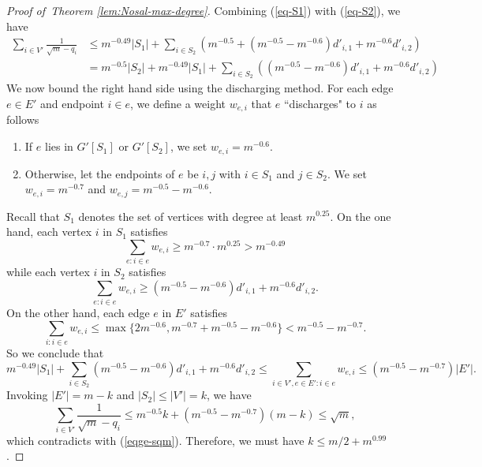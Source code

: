 \documentclass[10pt,a4paper]{amsart}
\newcommand*{\abs}[1]{\lvert#1\rvert}
\begin{document}
\begin{proof}[Proof of~Theorem \ref{lem:Nosal-max-degree}]
Combining (\ref{eq-S1}) with (\ref{eq-S2}), we have
\begin{align*}
 \sum_{i \in V'} \frac{1}{\sqrt{m} - q_i} &\leq m^{-0.49} \abs{S_1} + \sum_{i \in S_2} \left( 
m^{-0.5} + (m^{-0.5} - m^{-0.6}) d'_{i,1} + m^{-0.6} d'_{i,2} \right) \\
&= m^{-0.5} \abs{S_2} + m^{-0.49} \abs{S_1} + \sum_{i \in S_2} \left((m^{-0.5} - m^{-0.6}) d'_{i,1} + m^{-0.6} d'_{i,2} \right)
\end{align*}
We now bound the right hand side using the discharging method. For each edge $e \in E'$ and endpoint $i \in e$, we define a weight $w_{e, i}$ that $e$ ``discharges" to $i$ as follows
\begin{enumerate}
    \item If $e$ lies in $G'[S_1]$ or $G'[S_2]$, we set $w_{e, i} = m^{-0.6}$.
    \item Otherwise, let the endpoints of $e$ be $i, j$ with $i \in S_1$ and $j \in S_2$. We set $w_{e, i} = m^{-0.7}$ and $w_{e, j} = m^{-0.5} - m^{-0.6}$.
\end{enumerate}
Recall that $S_1$ denotes the set of vertices with degree at least $m^{0.25}$.  On the one hand, each vertex $i$ in $S_1$ satisfies
$$\sum_{e: i \in e} w_{e, i} \geq m^{-0.7} \cdot  m^{0.25} > m^{-0.49}$$
while each vertex $i$ in $S_2$ satisfies
$$\sum_{e: i \in e} w_{e, i} \geq (m^{-0.5} - m^{-0.6}) d'_{i,1} + m^{-0.6} d'_{i,2}.$$ 
On the other hand, each edge $e$ in $E'$ satisfies
\[ \sum_{i: i \in e} w_{e, i} \leq \max\{2m^{-0.6}, m^{-0.7} + m^{-0.5} - m^{-0.6}\} < m^{-0.5} - m^{-0.7} .\] 
So we conclude that
$$m^{-0.49} \abs{S_1} + \sum_{i \in S_2} (m^{-0.5} - m^{-0.6}) d'_{i,1} + m^{-0.6} d'_{i,2} 
\leq \sum_{i \in V', e \in E': i \in e} w_{e, i} \leq (m^{-0.5} - m^{-0.7}) \abs{E'}.$$
Invoking $|E'|=m-k$ and $|S_2| 
\le |V'| = k$, 
 we have
$$\sum_{i \in V'} \frac{1}{\sqrt{m} - q_i} \leq m^{-0.5} k + (m^{-0.5} - m^{-0.7})(m - k) \leq \sqrt{m},$$
which contradicts with (\ref{eqge-sqm}). 
Therefore, we must have $k \le m/2 + m^{0.99}$. 
\end{proof}
\end{document}
